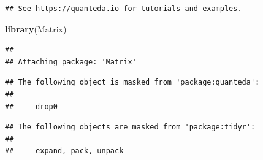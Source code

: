 \documentclass[
]{article}
\newenvironment{Shaded}{\begin{snugshade}}{\end{snugshade}}
\newcommand{\FunctionTok}[1]{\textcolor[rgb]{0.13,0.29,0.53}{\textbf{#1}}}
\newcommand{\NormalTok}[1]{#1}
\begin{document}
\begin{verbatim}
## See https://quanteda.io for tutorials and examples.
\end{verbatim}

\begin{Shaded}
\begin{Highlighting}[]
\FunctionTok{library}\NormalTok{(Matrix)}
\end{Highlighting}
\end{Shaded}

\begin{verbatim}
## 
## Attaching package: 'Matrix'
\end{verbatim}

\begin{verbatim}
## The following object is masked from 'package:quanteda':
## 
##     drop0
\end{verbatim}

\begin{verbatim}
## The following objects are masked from 'package:tidyr':
## 
##     expand, pack, unpack
\end{verbatim}
\end{document}

